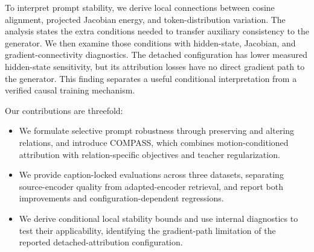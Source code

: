 To interpret prompt stability, we derive local connections between cosine
alignment, projected Jacobian energy, and token-distribution variation.
The analysis states the extra conditions needed to transfer auxiliary
consistency to the generator. We then examine those conditions with
hidden-state, Jacobian, and gradient-connectivity diagnostics. The detached
configuration has lower measured hidden-state sensitivity, but its attribution
losses have no direct gradient path to the generator. This finding separates
a useful conditional interpretation from a verified causal training mechanism.

Our contributions are threefold:
\begin{itemize}
    \item We formulate selective prompt robustness through preserving and
    altering relations, and introduce COMPASS, which combines motion-conditioned
    attribution with relation-specific objectives and teacher regularization.
    \item We provide caption-locked evaluations across three datasets,
    separating source-encoder quality from adapted-encoder retrieval, and
    report both improvements and configuration-dependent regressions.
    \item We derive conditional local stability bounds and use internal
    diagnostics to test their applicability, identifying the gradient-path
    limitation of the reported detached-attribution configuration.
\end{itemize}